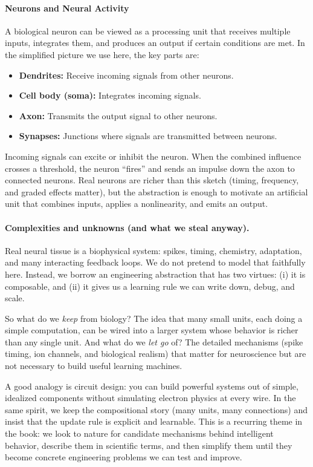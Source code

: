 \paragraph{Neurons and Neural Activity}

A biological neuron can be viewed as a processing unit that receives multiple inputs, integrates them, and produces an output if certain conditions are met. In the simplified picture we use here, the key parts are:

\begin{itemize}
    \item \textbf{Dendrites:} Receive incoming signals from other neurons.
    \item \textbf{Cell body (soma):} Integrates incoming signals.
    \item \textbf{Axon:} Transmits the output signal to other neurons.
    \item \textbf{Synapses:} Junctions where signals are transmitted between neurons.
\end{itemize}

Incoming signals can excite or inhibit the neuron. When the combined influence crosses a threshold, the neuron ``fires'' and sends an impulse down the axon to connected neurons. Real neurons are richer than this sketch (timing, frequency, and graded effects matter), but the abstraction is enough to motivate an artificial unit that combines inputs, applies a nonlinearity, and emits an output.

\paragraph{Complexities and unknowns (and what we steal anyway).}
Real neural tissue is a biophysical system: spikes, timing, chemistry, adaptation, and many interacting feedback loops. We do not pretend to model that faithfully here. Instead, we borrow an engineering abstraction that has two virtues: (i) it is composable, and (ii) it gives us a learning rule we can write down, debug, and scale.

So what do we \emph{keep} from biology? The idea that many small units, each doing a simple computation, can be wired into a larger system whose behavior is richer than any single unit. And what do we \emph{let go} of? The detailed mechanisms (spike timing, ion channels, and biological realism) that matter for neuroscience but are not necessary to build useful learning machines.

A good analogy is circuit design: you can build powerful systems out of simple, idealized components without simulating electron physics at every wire. In the same spirit, we keep the compositional story (many units, many connections) and insist that the update rule is explicit and learnable. This is a recurring theme in the book: we look to nature for candidate mechanisms behind intelligent behavior, describe them in scientific terms, and then simplify them until they become concrete engineering problems we can test and improve.

